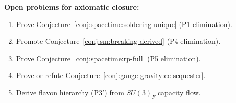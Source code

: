 \noindent
\textbf{Open problems for axiomatic closure:}
\begin{enumerate}[label=\textbf{A\arabic*.},leftmargin=*]
  \item Prove Conjecture~\ref{conj:spacetime:soldering-unique} (P1 elimination).
  \item Promote Conjecture~\ref{conj:sm:breaking-derived} (P4 elimination).
  \item Prove Conjecture~\ref{conj:spacetime:rp-full} (P5 elimination).
  \item Prove or refute Conjecture~\ref{conj:gauge-gravity:cc-sequester}.
  \item Derive flavon hierarchy (P3$'$) from $SU(3)_F$ capacity flow.
\end{enumerate}